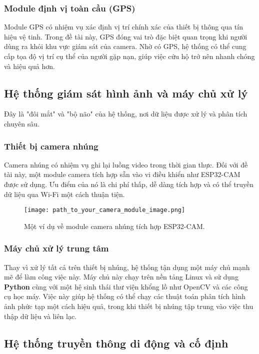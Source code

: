 \subsubsection{Module định vị toàn cầu (GPS)}
Module GPS có nhiệm vụ xác định vị trí chính xác của thiết bị thông qua tín hiệu vệ tinh. Trong đề tài này, GPS đóng vai trò đặc biệt quan trọng khi người dùng ra khỏi khu vực giám sát của camera. Nhờ có GPS, hệ thống có thể cung cấp tọa độ vị trí cụ thể của người gặp nạn, giúp việc cứu hộ trở nên nhanh chóng và hiệu quả hơn.

\subsection{Hệ thống giám sát hình ảnh và máy chủ xử lý}

Đây là "đôi mắt" và "bộ não" của hệ thống, nơi dữ liệu được xử lý và phân tích chuyên sâu.

\subsubsection{Thiết bị camera nhúng}
Camera nhúng có nhiệm vụ ghi lại luồng video trong thời gian thực. Đối với đề tài này, một module camera tích hợp sẵn vào vi điều khiển như ESP32-CAM được sử dụng. Ưu điểm của nó là chi phí thấp, dễ dàng tích hợp và có thể truyền dữ liệu qua Wi-Fi một cách thuận tiện.
\begin{figure}[h]
    \centering
    \texttt{[image: path\_to\_your\_camera\_module\_image.png]}
    \caption{Một ví dụ về module camera nhúng tích hợp ESP32-CAM.}
    \label{fig:esp32_cam}
\end{figure}

\subsubsection{Máy chủ xử lý trung tâm}
Thay vì xử lý tất cả trên thiết bị nhúng, hệ thống tận dụng một máy chủ mạnh mẽ để làm công việc này. Máy chủ này chạy trên nền tảng Linux và sử dụng \textbf{Python} cùng với một hệ sinh thái thư viện khổng lồ như OpenCV và các công cụ học máy. Việc này giúp hệ thống có thể chạy các thuật toán phân tích hình ảnh phức tạp một cách hiệu quả, trong khi thiết bị nhúng tập trung vào việc thu thập dữ liệu và liên lạc.

\subsection{Hệ thống truyền thông di động và cố định}

